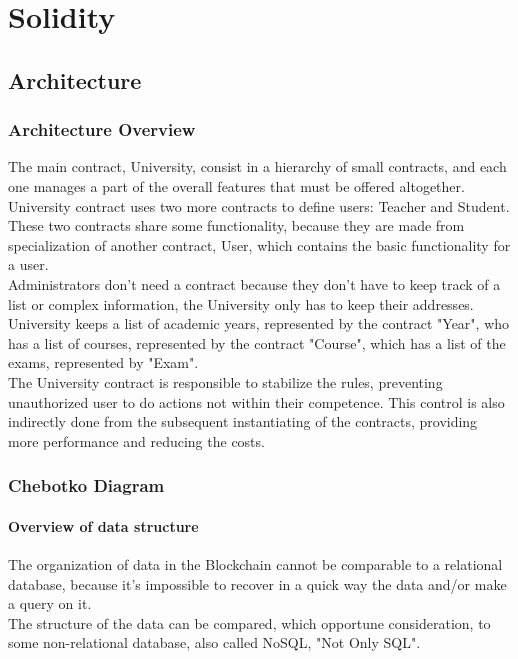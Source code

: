 \documentclass[ManualeSviluppatore]{subfiles}
\begin{document}

\chapter{Solidity}
\section{Architecture}
\subsection{Architecture Overview}
The main contract, University, consist in a hierarchy of small contracts, and each one manages a part of the overall features that must be offered altogether.\\
University contract uses two more contracts to define users: Teacher and Student. These two contracts share some functionality, because they are made from specialization of another contract, User, which contains the basic functionality for a user.\\
Administrators don't need a contract because they don't have to keep track of a list or complex information, the University only has to keep their addresses.\\
University keeps a list of academic years, represented by the contract "Year", who has a list of courses, represented by the contract "Course", which has a list of the exams, represented by "Exam".\\

The University contract is responsible to stabilize the rules, preventing unauthorized user to do actions not within their competence. This control is also indirectly done from the subsequent instantiating of the contracts, providing more performance and reducing the costs.\\

\subsection{Chebotko Diagram}
\subsubsection{Overview of data structure}
The organization of data in the Blockchain cannot be comparable to a relational database, because it's impossible to recover in a quick way the data and/or make a query on it.\\
The structure of the data can be compared, which opportune consideration, to some non-relational database, also called NoSQL, "Not Only SQL".\\
\end{document}
